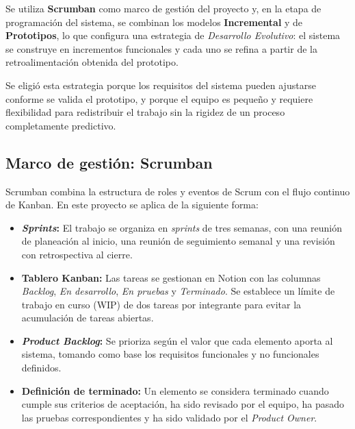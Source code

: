 
Se utiliza \textbf{Scrumban} como marco de gestión del proyecto y, en la etapa de programación del sistema, se combinan los modelos \textbf{Incremental} y de \textbf{Prototipos}, lo que configura una estrategia de \textit{Desarrollo Evolutivo}: el sistema se construye en incrementos funcionales y cada uno se refina a partir de la retroalimentación obtenida del prototipo.

Se eligió esta estrategia porque los requisitos del sistema pueden ajustarse conforme se valida el prototipo, y porque el equipo es pequeño y requiere flexibilidad para redistribuir el trabajo sin la rigidez de un proceso completamente predictivo.

\subsection{Marco de gestión: Scrumban}


Scrumban combina la estructura de roles y eventos de Scrum con el flujo continuo de Kanban. En este proyecto se aplica de la siguiente forma:

\begin{itemize}
    \item \textbf{\textit{Sprints}:} El trabajo se organiza en \textit{sprints} de tres semanas, con una reunión de planeación al inicio, una reunión de seguimiento semanal y una revisión con retrospectiva al cierre.
    \item \textbf{Tablero Kanban:} Las tareas se gestionan en Notion con las columnas \textit{Backlog}, \textit{En desarrollo}, \textit{En pruebas} y \textit{Terminado}. Se establece un límite de trabajo en curso (WIP) de dos tareas por integrante para evitar la acumulación de tareas abiertas.
    \item \textbf{\textit{Product Backlog}:} Se prioriza según el valor que cada elemento aporta al sistema, tomando como base los requisitos funcionales y no funcionales definidos.
    \item \textbf{Definición de terminado:} Un elemento se considera terminado cuando cumple sus criterios de aceptación, ha sido revisado por el equipo, ha pasado las pruebas correspondientes y ha sido validado por el \textit{Product Owner}.
\end{itemize}

